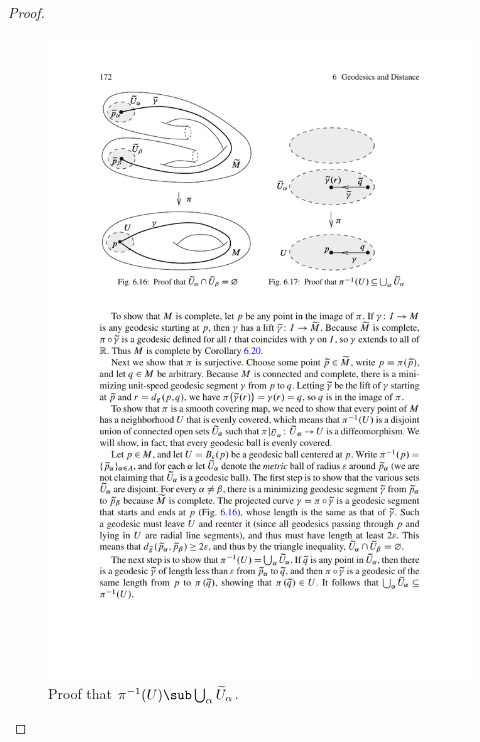 \begin{proof}
\begin{figure}[htbp]
\begin{minipage}[b]{200pt}
\includegraphics{pictures/local-isometry-cover-3}
\caption{Proof that $\pi^{-1}(U)\sub\bigcup_\alpha\widetilde{U}_\alpha$.}
\end{minipage}
\end{figure}


\end{proof}
